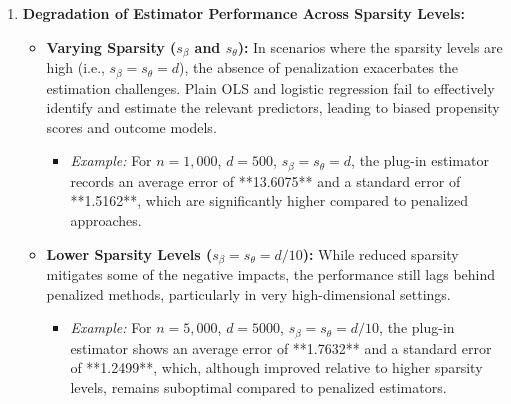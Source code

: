\documentclass{article}
\begin{document}
\begin{enumerate}
  \item \textbf{Degradation of Estimator Performance Across Sparsity Levels:}
    \begin{itemize}
      \item \textbf{Varying Sparsity (\( s_\beta \) and \( s_\theta \)):} In scenarios where the sparsity levels are high (i.e., \( s_\beta = s_\theta = d \)), the absence of penalization exacerbates the estimation challenges. Plain OLS and logistic regression fail to effectively identify and estimate the relevant predictors, leading to biased propensity scores and outcome models.
        \begin{itemize}
          \item \textit{Example:} For \( n = 1,000 \), \( d = 500 \), \( s_\beta = s_\theta = d \), the plug-in estimator records an average error of **13.6075** and a standard error of **1.5162**, which are significantly higher compared to penalized approaches.
        \end{itemize}
      \item \textbf{Lower Sparsity Levels (\( s_\beta = s_\theta = d/10 \)):} While reduced sparsity mitigates some of the negative impacts, the performance still lags behind penalized methods, particularly in very high-dimensional settings.
        \begin{itemize}
          \item \textit{Example:} For \( n = 5,000 \), \( d = 5000 \), \( s_\beta = s_\theta = d/10 \), the plug-in estimator shows an average error of **1.7632** and a standard error of **1.2499**, which, although improved relative to higher sparsity levels, remains suboptimal compared to penalized estimators.
        \end{itemize}
    \end{itemize}


\end{enumerate}
\end{document}
